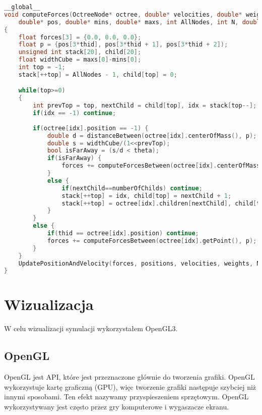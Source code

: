 \documentclass[14pt,twoside,a4paper]{article}
\theoremstyle{definition}
\begin{document}
\bigskip
{} 
\begin{lstlisting}[language=C++, frame=single, framerule=2pt, caption=Liczenie siły oddziałującej na ciało w układzie]
__global__
void computeForces(OctreeNode* octree, double* velocities, double* weights, 
    double* pos, double* mins, double* maxs, int AllNodes, int N, double dt) 
{	
    float forces[3] = {0.0, 0.0, 0.0};
    float p = {pos[3*thid], pos[3*thid + 1], pos[3*thid + 2]);
    unsigned int stack[20], child[20];
    float widthCube = maxs[0]-mins[0];
    int top = -1;
    stack[++top] = AllNodes - 1, child[top] = 0;

    while(top>=0) 
    {
    	int prevTop = top, nextChild = child[top], idx = stack[top--];
        if(idx == -1) continue;
        
        if(octree[idx].position == -1) {
            double d = distanceBetween(octree[idx].centerOfMass(), p);
            double s = widthCube/(1<<prevTop);
            bool isFarAway = (s/d < theta);
            if(isFarAway) {
            	forces += computeForcesBetween(octree[idx].centerOfMass, p);
            }
            else {
                if(nextChild==numberOfChilds) continue;
                stack[++top] = idx, child[top] = nextChild + 1;
                stack[++top] = octree[idx].children[nextChild], child[top] = 0;
            }
        } 
        else {
       	    if(thid == octree[idx].position) continue;
        	forces += computeForcesBetween(octree[idx].getPoint(), p);	
        }
    }    
    UpdatePositionAndVelocity(forces, positions, velocities, weights, N, dt);
}
\end{lstlisting}

\section{\LARGE Wizualizacja}
	
W celu wizualizacji symulacji wykorzystałem OpenGL3. 

\subsection{\large OpenGL}
OpenGL \cite{opengl} jest API, które jest przeznaczone głównie do tworzenia grafiki. OpenGL wykorzystuje kartę graficzną (GPU), więc tworzenie grafiki następuje szybciej niż innymi sposobami. Ten efekt nazywamy przyspieszeniem sprzętowym. OpenGL wykorzystywany jest często przez gry komputerowe i wygaszacze ekranu.
\end{document}
